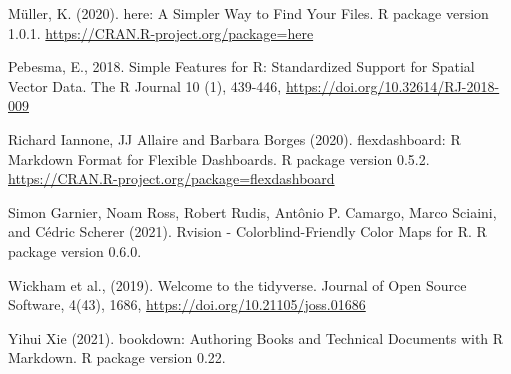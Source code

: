 \documentclass[11pt,a4paper,]{article}
\begin{document}
Müller, K. (2020). here: A Simpler Way to Find Your Files. R package version 1.0.1. \url{https://CRAN.R-project.org/package=here}

Pebesma, E., 2018. Simple Features for R: Standardized Support for Spatial Vector Data. The R Journal 10 (1), 439-446, \url{https://doi.org/10.32614/RJ-2018-009}

Richard Iannone, JJ Allaire and Barbara Borges (2020). flexdashboard: R Markdown Format for Flexible Dashboards. R package version 0.5.2. \url{https://CRAN.R-project.org/package=flexdashboard}

Simon Garnier, Noam Ross, Robert Rudis, Antônio P. Camargo, Marco Sciaini, and Cédric Scherer (2021). Rvision - Colorblind-Friendly Color Maps for R. R package version 0.6.0.

Wickham et al., (2019). Welcome to the tidyverse. Journal of Open Source Software, 4(43), 1686, \url{https://doi.org/10.21105/joss.01686}

Yihui Xie (2021). bookdown: Authoring Books and Technical Documents with R Markdown. R package version 0.22.

\printbibliography
\end{document}
